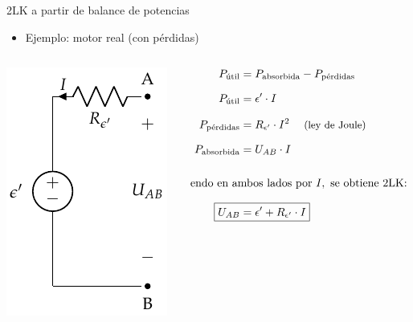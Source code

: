 \documentclass[aspectratio=169, xcolor={usenames,svgnames,dvipsnames}]{beamer}
\begin{document}
\begin{frame}{2LK a partir de balance de potencias}
    \begin{itemize}
        \item Ejemplo: \alert{motor} real (con pérdidas)
    \end{itemize}
    \begin{columns}
    \begin{column}{0.3\columnwidth}
        \begin{center}
        \includegraphics[height=0.6\textheight]{../figs/receptor_real.pdf}        
        \end{center}
    \end{column}
    \begin{column}{0.4\columnwidth}
    \begin{align*}
        P_{\textrm{útil}} &= P_{\textrm{absorbida}} - P_{\textrm{pérdidas}}\\[7pt]
        P_{\textrm{útil}} &= \epsilon'\cdot I\\[7pt]
        P_{\textrm{pérdidas}} &= R_{\epsilon'}\cdot I^2 \quad\; \text{\small{(ley de Joule)}}\\[7pt]
        P_{\textrm{absorbida}} &= U_{AB}\cdot I\\[15pt]
        & \hspace{-25mm}\text{Dividiendo en ambos lados por } I, \text{ se obtiene 2LK:}\\[7pt]
        \Aboxed{U_{AB}&=\epsilon'+R_{\epsilon'}\cdot I}
    \end{align*}
    \end{column}
    \end{columns}
\end{frame}

\end{document}
